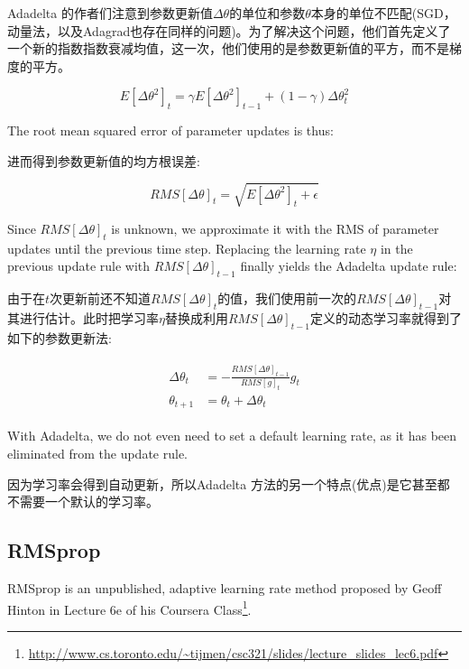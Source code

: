 \documentclass{article}
\begin{document}
Adadelta 的作者们注意到参数更新值$\Delta\theta$的单位和参数$\theta$本身的单位不匹配(SGD，动量法，以及Adagrad也存在同样的问题)。为了解决这个问题，他们首先定义了一个新的指数指数衰减均值，这一次，他们使用的是参数更新值的平方，而不是梯度的平方。

\begin{equation}
E[\Delta \theta^2]_t = \gamma E[\Delta \theta^2]_{t-1} + (1 - \gamma) \Delta \theta^2_t
\end{equation}

The root mean squared error of parameter updates is thus: 

进而得到参数更新值的均方根误差:

\begin{equation}
RMS[\Delta \theta]_{t} = \sqrt{E[\Delta \theta^2]_t + \epsilon}
\end{equation}

Since $RMS[\Delta \theta]_{t}$ is unknown, we approximate it with the RMS of parameter updates until the previous time step. Replacing the learning rate $\eta $ in the previous update rule with $RMS[\Delta \theta]_{t-1}$ finally yields the Adadelta update rule:

由于在$t$次更新前还不知道$RMS[\Delta \theta]_{t}$的值，我们使用前一次的$RMS[\Delta \theta]_{t-1}$对其进行估计。此时把学习率$\eta$替换成利用$RMS[\Delta \theta]_{t-1}$定义的动态学习率就得到了如下的参数更新法:

\begin{align}
\begin{split}
\Delta \theta_t &= - \frac{RMS[\Delta \theta]_{t-1}}{RMS[g]_{t}} g_{t}\\
\theta_{t+1} &= \theta_t + \Delta \theta_t
\end{split}
\end{align}

With Adadelta, we do not even need to set a default learning rate, as it has been eliminated from the update rule.

因为学习率会得到自动更新，所以Adadelta 方法的另一个特点(优点)是它甚至都不需要一个默认的学习率。

\subsection{RMSprop}

RMSprop is an unpublished, adaptive learning rate method proposed by Geoff Hinton in Lecture 6e of his Coursera Class\footnote{\url{http://www.cs.toronto.edu/~tijmen/csc321/slides/lecture_slides_lec6.pdf}}.
\end{document}
